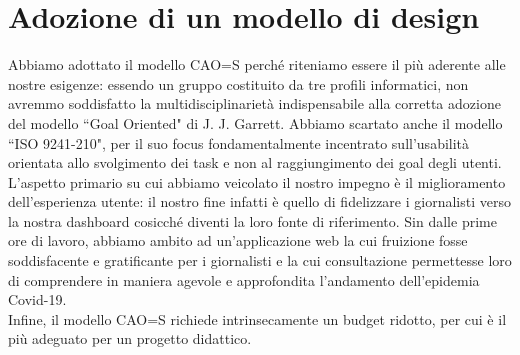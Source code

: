 \section{Adozione di un modello di design}
\label{s:adozione-modello-design}

Abbiamo adottato il modello CAO=S perché riteniamo essere il più aderente alle nostre esigenze: essendo un gruppo costituito da tre profili informatici, non avremmo soddisfatto la multidisciplinarietà indispensabile alla corretta adozione del modello ``Goal Oriented" di J. J. Garrett.
Abbiamo scartato anche il modello ``ISO 9241-210", per il suo focus fondamentalmente incentrato sull'usabilità orientata allo svolgimento dei task e non al raggiungimento dei goal degli utenti.
L'aspetto primario su cui abbiamo veicolato il nostro impegno è il miglioramento dell'esperienza utente: il nostro fine infatti è quello di fidelizzare i giornalisti verso la nostra dashboard cosicché diventi la loro fonte di riferimento.
Sin dalle prime ore di lavoro, abbiamo ambito ad un'applicazione web la cui fruizione fosse soddisfacente e gratificante per i giornalisti e la cui consultazione permettesse loro di comprendere in maniera agevole e approfondita l'andamento dell'epidemia Covid-19.\\
Infine, il modello CAO=S richiede intrinsecamente un budget ridotto, per cui è il più adeguato per un progetto didattico. 